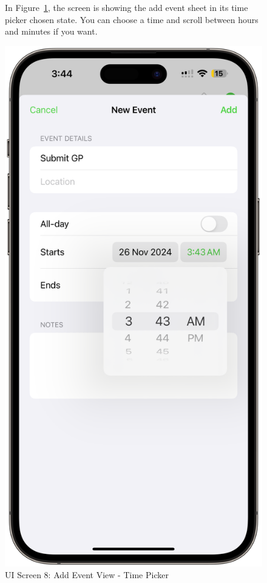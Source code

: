 \begin{figure}[!h]
    \begin{minipage}{0.65\textwidth}
        In Figure~\ref{fig:ui-screen-8}, the screen is showing the add event sheet in its time picker chosen state. You can choose a time and scroll between hours and minutes if you want.
    \end{minipage}
    \hfill
    \begin{minipage}{0.3\textwidth}
        \centering
        \includegraphics[width=\textwidth]{images/screen8.png}
        \caption{UI Screen 8: Add Event View - Time Picker}
        \label{fig:ui-screen-8}
    \end{minipage}
\end{figure}

